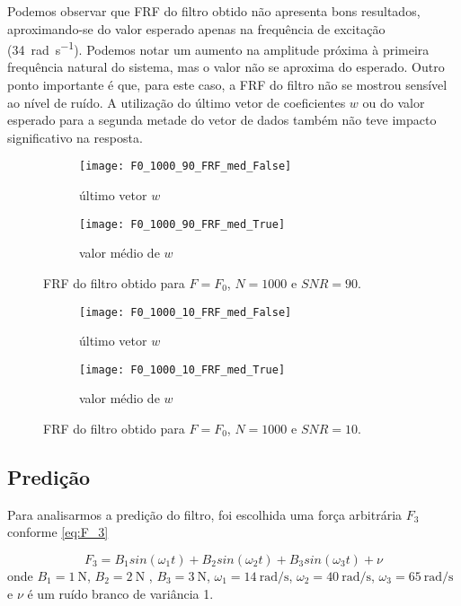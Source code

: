 Podemos observar que FRF do filtro obtido não apresenta bons resultados, aproximando-se do valor esperado apenas na frequência de excitação (\SI{34}{\radian \per \s}). Podemos notar um aumento na amplitude próxima à primeira frequência natural do sistema, mas o valor não se aproxima do esperado. Outro ponto importante é que, para este caso, a FRF do filtro não se mostrou sensível ao nível de ruído. A utilização do último vetor de coeficientes $ w $ ou do valor esperado para a segunda metade do vetor de dados também não teve impacto significativo na resposta. 

\begin{figure}
	\centering
	\begin{subfigure}{0.9\textwidth}
		\centering
		\texttt{[image: F0\_1000\_90\_FRF\_med\_False]}
		\caption{último vetor $ w $}
		\label{fig:F0_1000_90_FRF_med_False}
	\end{subfigure}
	\begin{subfigure}{0.9\textwidth}
		\centering
		\texttt{[image: F0\_1000\_90\_FRF\_med\_True]}
		\caption{valor médio de $ w $}
		\label{fig:F0_1000_90_FRF_med_True}
	\end{subfigure}
	\caption{FRF do filtro obtido para $ F=F_0 $, $ N=1000 $ e $ SNR=90 $.}
\end{figure}

\begin{figure}
	\centering
	\begin{subfigure}{0.9\textwidth}
		\centering
		\texttt{[image: F0\_1000\_10\_FRF\_med\_False]}
		\caption{último vetor $ w $}
		\label{fig:F0_1000_10_FRF_med_False}
	\end{subfigure}
	\begin{subfigure}{0.9\textwidth}
		\centering
		\texttt{[image: F0\_1000\_10\_FRF\_med\_True]}
		\caption{valor médio de $ w $}
		\label{fig:F0_1000_10_FRF_med_True}
	\end{subfigure}
	\caption{FRF do filtro obtido para $ F=F_0 $, $ N=1000 $ e $ SNR=10 $.}
	\label{fig:F0_1000_10_FRF}
\end{figure}

\subsection{Predição}

Para analisarmos a predição do filtro, foi escolhida uma força arbitrária $ F_3 $ conforme \cref{eq:F_3}

\begin{equation}\label{eq:F_3}
F_3 = B_1 sin(\omega_1 t)
+ B_2 sin(\omega_2 t)
+ B_3 sin(\omega_3 t)
+ \nu
\end{equation}
onde $ B_1=\SI{1}{\N} $, $ B_2=\SI{2}{\N}$ , $ B_3=\SI{3}{\N} $, $ \omega_1= \SI{14}{\radian \per \s} $, $ \omega_2= \SI{40}{\radian \per \s} $, $ \omega_3= \SI{65}{\radian \per \s} $ e $ \nu $ é um ruído branco de variância 1.

